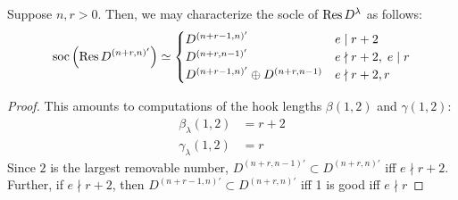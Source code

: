 \documentclass{amsart}
\begin{document}
\begin{corollary}
  Suppose $n,r > 0$.
  Then, we may characterize the socle of $\text{Res} \, D^\lambda$ as follows:
  \[
    \text{soc}\left( \text{Res} \, D^{(n+r,n)'} \right) \simeq \begin{cases}
      D^{(n + r - 1,n)'} & e \mid r+2\\
      D^{(n + r,n-1)'} & e \nmid r+2, \; e \mid r\\
      D^{(n+r-1,n)'} \oplus D^{(n+r,n-1)} & e \nmid r+2,r
    \end{cases}
  \]
\end{corollary}
\begin{proof}
  This amounts to computations of the hook lengths $\beta(1,2)$ and $\gamma(1,2)$:
  \begin{align*}
    \beta_\lambda(1,2) &= r + 2\\
    \gamma_\lambda(1,2) &= r
  \end{align*}
  Since $2$ is the largest removable number, $D^{(n+r,n-1)'} \subset D^{(n+r,n)'}$ iff $e \nmid r + 2$.
  Further, if $e \nmid r + 2$, then $D^{(n+r-1,n)'} \subset D^{(n+r,n)'}$ iff 1 is good iff $e \nmid r$
\end{proof}
\end{document}
